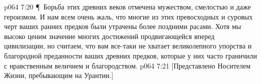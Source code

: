 \vs p064 7:20 \P\ Борьба этих древних веков отмечена мужеством, смелостью и даже героизмом. И нам всем очень жаль, что многие из этих превосходных и суровых черт ваших ранних предков были утрачены более поздними расами. Хотя мы высоко ценим значение многих достижений продвигающейся вперед цивилизации, но считаем, что вам все\hyp{}таки не хватает великолепного упорства и благородной преданности ваших древних предков, которые у них часто граничили с нравственным величием и благородством.
\vs p064 7:21 [Представлено Носителем Жизни, пребывающим на Урантии.]
